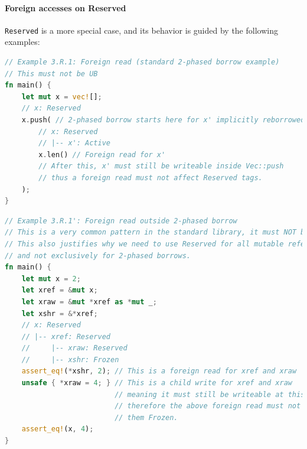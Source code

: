 \documentclass[a4paper,11pt]{article}
\theoremstyle{plain}
\theoremstyle{definition}
\theoremstyle{remark}
\newcommand{\tperm}[1]{\texttt{#1}}
\begin{document}
\paragraph*{Foreign accesses on Reserved}

\tperm{Reserved} is a more special case, and its behavior is guided by the following examples:
\begin{lstlisting}[language=rust]
// Example 3.R.1: Foreign read (standard 2-phased borrow example)
// This must not be UB
fn main() {
    let mut x = vec![];
    // x: Reserved
    x.push( // 2-phased borrow starts here for x' implicitly reborrowed from x
        // x: Reserved
        // |-- x': Active
        x.len() // Foreign read for x'
        // After this, x' must still be writeable inside Vec::push
        // thus a foreign read must not affect Reserved tags.
    );
}
\end{lstlisting}

\begin{lstlisting}[language=rust]
// Example 3.R.1': Foreign read outside 2-phased borrow
// This is a very common pattern in the standard library, it must NOT be UB.
// This also justifies why we need to use Reserved for all mutable references,
// and not exclusively for 2-phased borrows.
fn main() {
    let mut x = 2;
    let xref = &mut x;
    let xraw = &mut *xref as *mut _;
    let xshr = &*xref;
    // x: Reserved
    // |-- xref: Reserved
    //     |-- xraw: Reserved
    //     |-- xshr: Frozen
    assert_eq!(*xshr, 2); // This is a foreign read for xref and xraw
    unsafe { *xraw = 4; } // This is a child write for xref and xraw
                          // meaning it must still be writeable at this point,
                          // therefore the above foreign read must not have turned
                          // them Frozen.
    assert_eq!(x, 4);
}
\end{lstlisting}
\end{document}
